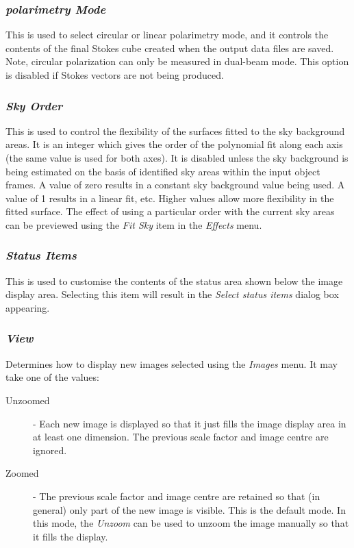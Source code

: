 \documentclass[11pt]{article}
\newcommand{\htmlref}[2]{#1}
\newcommand{\xlabel}[1]{}
\newcommand{\mylabel}[1] {\xlabel{#1}\label{#1}}
\begin{document}
\subsubsection {\mylabel{POLKA_POLMODE}\emph{polarimetry Mode}} This is used
to select circular or linear polarimetry mode, and it controls the
contents of the final Stokes cube created when the output data files are
saved. Note, circular polarization can only be measured in dual-beam mode.
This option is disabled if Stokes vectors are not being produced.

\subsubsection {\mylabel{POLKA_SKYORDER}\emph{Sky Order}} This is used to control
the flexibility of the surfaces fitted to the sky background areas. It is
an integer which gives the order of the polynomial fit along each axis
(the same value is used for both axes). It is disabled unless the sky
background is being estimated on the basis of identified sky areas within
the input object frames. A value of zero results in a constant sky
background value being used. A value of 1 results in a linear fit, etc.
Higher values allow more flexibility in the fitted surface. The effect of
using a particular order with the current sky areas can be previewed
using the
\htmlref{\emph{Fit Sky}}{POLKA_FITSKY_EFFECT} item in the
\htmlref{\emph{Effects}}{POLKA_EFFECTS_MENU} menu.

\subsubsection {\mylabel{POLKA_STATUS_ITEMS}\emph{Status Items}} This is used to
customise the contents of the \htmlref{status area}{POLKA_STATUS_AREA}
shown below the image display area. Selecting this item will result in the
\htmlref{\emph{Select status items}}{POLKA_STATUS_ITEMS_DIALOG} dialog
box appearing.

\subsubsection {\mylabel{POLKA_VIEW}\emph{View}} Determines how to display new
images selected using the \htmlref{\emph{Images}}{POLKA_IMAGES_MENU}
menu. It may take one of the values:

\begin{description}

\item [Unzoomed] - Each new image is displayed so that it just fills the
image display area in at least one dimension. The previous scale factor
and image centre are ignored.

\item [Zoomed] - The previous scale factor and image centre are retained
so that (in general) only part of the new image is visible. This is the
default mode. In this mode, the \htmlref{\emph{Unzoom}}{POLKA_UNZOOM} can
be used to unzoom the image manually so that it fills the display.

\end{description}
\end{document}
